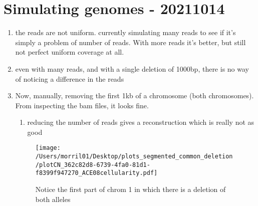 \documentclass[11pt,a4paper,roman]{article}
\begin{document}
\clearpage

\section{Simulating genomes - 20211014}
\begin{enumerate}
\item the reads are not uniform. currently simulating many reads to see if it's simply a problem of number of reads. With more reads it's better, but still not perfect uniform coverage at all.
\item even with many reads, and with a single deletion of 1000bp, there is no way of noticing a difference in the reads
\item Now, manually, removing the first 1kb of a chromosome (both chromosomes). From inspecting the bam files, it looks fine.
\begin{enumerate}
\item reducing the number of reads gives a reconstruction which is really not as good
\end{enumerate}

\begin{figure}[h]
\centering
\texttt{[image: /Users/morril01/Desktop/plots\_segmented\_common\_deletion/plotCN\_362c82d8-6739-4fa0-81d1-f8399f947270\_ACE08cellularity.pdf]}
\caption{Notice the first part of chrom 1 in which there is a deletion of both alleles}
\end{figure}




\end{enumerate}
\end{document}
